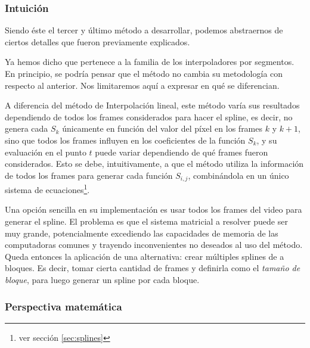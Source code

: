 \subsubsection*{\bf{Intuición}}

Siendo \'este el tercer y \'ultimo m\'etodo a desarrollar, podemos abstraernos de ciertos detalles que fueron previamente explicados.

Ya hemos dicho que pertenece a la familia de los interpoladores por segmentos. En principio, se podr\'ia pensar que el método no cambia su metodolog\'ia con respecto al anterior. Nos limitaremos aquí a expresar en qué se diferencian.

A diferencia del m\'etodo de Interpolaci\'on lineal, este método varía sus resultados dependiendo de todos los frames considerados para hacer el spline, es decir, no genera cada $S_k$ únicamente en función del valor del píxel en los frames $k$ y $k+1$, sino que todos los frames influyen en los coeficientes de la funci\'on $S_k$, y su evaluación en el punto $t$ puede variar dependiendo de qué frames fueron considerados. Esto se debe, intuitivamente, a que el método utiliza la información de todos los frames para generar cada función $S_{i,j}$, combinándola en un único sistema de ecuaciones\footnote{ver sección \ref{sec:splines}}.

Una opción sencilla en su implementación es usar todos los frames del video para generar el spline. El problema es que el sistema matricial a resolver puede ser muy grande, potencialmente excediendo las capacidades de memoria de las computadoras comunes y trayendo inconvenientes no deseados al uso del método. Queda entonces la aplicación de una alternativa: crear múltiples splines de a bloques. Es decir, tomar cierta cantidad de frames y definirla como el \textit{tamaño de bloque}, para luego generar un spline por cada bloque.

\subsubsection*{\bf{Perspectiva matem\'atica}}